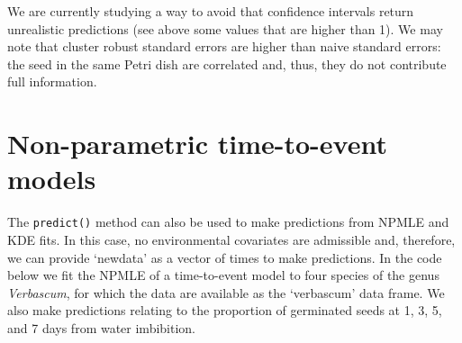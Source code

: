\documentclass[
]{book}
\begin{document}
We are currently studying a way to avoid that confidence intervals return unrealistic predictions (see above some values that are higher than 1). We may note that cluster robust standard errors are higher than naive standard errors: the seed in the same Petri dish are correlated and, thus, they do not contribute full information.

\hypertarget{non-parametric-time-to-event-models}{%
\section{Non-parametric time-to-event models}\label{non-parametric-time-to-event-models}}

The \texttt{predict()} method can also be used to make predictions from NPMLE and KDE fits. In this case, no environmental covariates are admissible and, therefore, we can provide `newdata' as a vector of times to make predictions. In the code below we fit the NPMLE of a time-to-event model to four species of the genus \emph{Verbascum}, for which the data are available as the `verbascum' data frame. We also make predictions relating to the proportion of germinated seeds at 1, 3, 5, and 7 days from water imbibition.
\end{document}
